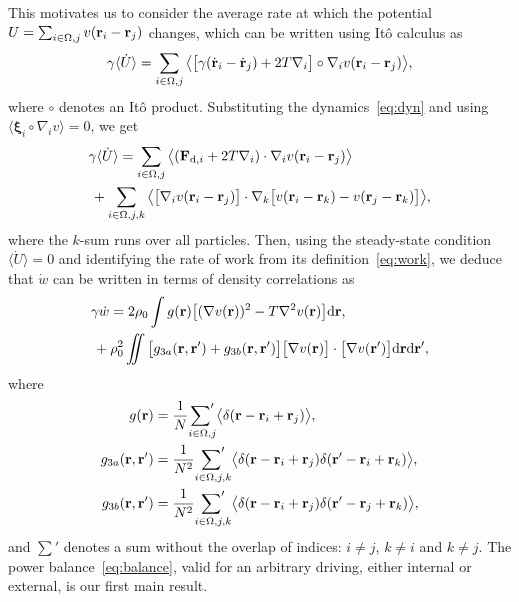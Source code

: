 \documentclass[superscriptaddress, twocolumn, prx, longbibliography, nofootinbib]{revtex4-1}
\newcommand{\dd}{\text{d}}
\begin{document}
This motivates us to consider the average rate at which the potential $U = \sum_{i\in\Omega,j} v({\bf r}_i-{\bf r}_j)$ changes, which can be written using It\^o calculus as
\begin{equation}
	\gamma\langle\dot U \rangle = \sum_{i\in\Omega,j} \big\langle\big[\gamma(\dot{\bf r}_i - \dot{\bf r}_j) + 2 T \nabla_i\big] \circ \nabla_i v({\bf r}_i-{\bf r}_j)\big\rangle ,
\end{equation}
where $\circ$ denotes an It\^o product. Substituting the dynamics~\eqref{eq:dyn} and using $\langle{\boldsymbol\xi}_i\circ\nabla_i v\rangle=0$, we get
\begin{equation}\label{eq:dotU}
	\begin{aligned}
		&\gamma\langle\dot U \rangle = \sum_{i\in\Omega,j} \big\langle({\bf F}_{{\rm d},i} + 2 T \nabla_i) \cdot \nabla_i v({\bf r}_i-{\bf r}_j)\big\rangle
		\\
		&\,+ \sum_{i\in\Omega,j,k} \big\langle \big[\nabla_i v({\bf r}_i-{\bf r}_j)\big]\cdot \nabla_k \big[ v({\bf r}_i-{\bf r}_k) - v({\bf r}_j-{\bf r}_k) \big] \big\rangle ,
    \end{aligned}
\end{equation}
where the $k$-sum runs over all particles. Then, using the steady-state condition $\langle\dot U \rangle=0$ and identifying the rate of work from its definition~\eqref{eq:work}, we deduce that $\dot w$ can be written in terms of density correlations as
\begin{equation}\label{eq:balance}
	\begin{aligned}
		&\gamma\dot w = 2\rho_0 \int g({\bf r}) \big[(\nabla v({\bf r}))^2 - T \nabla^2 v({\bf r})\big] \dd{\bf r} ,
		\\
		&\, + \rho_0^2 \iint\big[ g_{3a}({\bf r}, {\bf r}') + g_{3b}({\bf r}, {\bf r}')\big]  \big[\nabla v({\bf r})\big] \cdot \big[\nabla v({\bf r}')\big] \dd{\bf r} \dd{\bf r}' ,
	\end{aligned}
\end{equation}
where
\begin{equation}
	\begin{aligned}
 		g({\bf r}) &= \frac{1}{N} \underset{i\in\Omega,j}{{\sum}'} \big\langle \delta({\bf r}-{\bf r}_i+{\bf r}_j)\big\rangle ,
		\\
 		g_{3a}({\bf r},{\bf r}') &= \frac{1}{N^2} \underset{i\in\Omega,j,k}{{\sum}'} \big\langle \delta({\bf r}-{\bf r}_i+{\bf r}_j) \delta({\bf r}'-{\bf r}_i+{\bf r}_k)\big\rangle ,
		\\
 		g_{3b}({\bf r},{\bf r}') &= \frac{1}{N^2} \underset{i\in\Omega,j,k}{{\sum}'} \big\langle \delta({\bf r}-{\bf r}_i+{\bf r}_j) \delta({\bf r}'-{\bf r}_j+{\bf r}_k)\big\rangle ,
	\end{aligned}
\end{equation}
and $\sum'$ denotes a sum without the overlap of indices: $i\neq j$, $k\neq i$ and $k\neq j$. The power balance~\eqref{eq:balance}, valid for an arbitrary driving, either internal or external, is our first main result.
\end{document}
